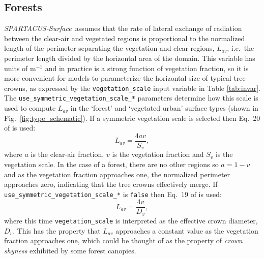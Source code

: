 \documentclass[a4,oneside]{article}
\def\codesize{\small}
\def\spsurf{\emph{SPARTACUS-Surface}}
\def\code#1{{\codesize\texttt{#1}}}
\begin{document}
\subsection{Forests}
\spsurf\ assumes that the rate of lateral exchange of radiation
between the clear-air and vegetated regions is proportional to the
normalized length of the perimeter separating the vegetation and clear
regions, $L_{av}$, i.e.\ the perimeter length divided by the horizontal
area of the domain. This variable has units of m$^{-1}$ and in
practice is a strong function of vegetation fraction, so it is more
convenient for models to parameterize the horizontal size of typical
tree crowns, as expressed by the \code{vegetation\_scale} input
variable in Table \ref{tab:invar}. The
\code{use\_symmetric\_vegetation\_scale\_*} parameters determine how
this scale is used to compute $L_{av}$ in the `forest' and `vegetated
urban' surface types (shown in Fig.\ \ref{fig:type_schematic}).  If a
symmetric vegetation scale is selected then Eq.\ 20 of
\cite{Hogan+2018} is used:
%
\begin{equation}
  L_{av}=\frac{4av}{S_v},\label{eq:S}
\end{equation}
%
where $a$ is the clear-air fraction, $v$ is the vegetation fraction
and $S_v$ is the vegetation scale.  In the case of a forest, there are
no other regions so $a=1-v$ and as the vegetation fraction approaches
one, the normalized perimeter approaches zero, indicating that the
tree crowns effectively merge. If
\code{use\_symmetric\_vegetation\_scale\_*} is \code{false} then
Eq.\ 19 of \cite{Hogan+2018} is used:
%
\begin{equation}
  L_{av}=\frac{4v}{D_v},\label{eq:D}
\end{equation}
%
where this time \code{vegetation\_scale} is interpreted as the
effective crown diameter, $D_v$. This has the property that $L_{av}$
approaches a constant value as the vegetation fraction approaches one,
which could be thought of as the property of \emph{crown shyness}
exhibited by some forest canopies.
\end{document}
